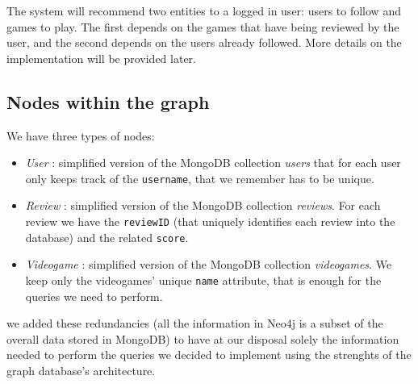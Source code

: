 The system will recommend two entities to a logged in user: users to follow and games to play. The first depends on the games that have being reviewed by the user, and the second depends on the users already followed. More details on the implementation will be provided later. 
\subsection{Nodes within the graph}
We have three types of nodes:
\begin{itemize}
    \item \emph{User} : simplified version of the MongoDB collection \emph{users} that for each user only keeps track of the \texttt{username}, that we remember has to be unique.
    \item \emph{Review} : simplified version of the MongoDB collection \emph{reviews}. For each review we have the \texttt{reviewID} (that uniquely identifies each review into the database) and the related \texttt{score}.
    \item \emph{Videogame} : simplified version of the MongoDB collection \emph{videogames}. We keep only the videogames' unique \texttt{name} attribute, that is enough for the queries we need to perform. 
\end{itemize}
we added these redundancies (all the information in Neo4j is a subset of the overall data stored in MongoDB) to have at our disposal solely the information needed to perform the queries we decided to implement using the strenghts of the graph database's architecture. 
